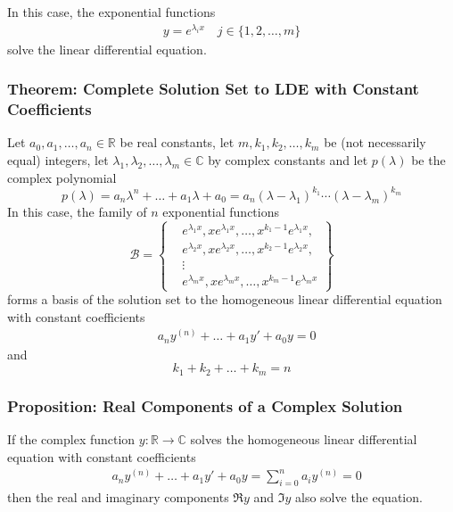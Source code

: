 \documentclass[11pt, a4paper]{article}
\newcommand{\R}{\mathbb{R}} %
\begin{document}
	In this case, the exponential functions
\begin{align*}
	y = e^{\lambda_i x} \quad j \in  \{1, 2, \dots, m\}
\end{align*}
solve the linear differential equation.

\subsubsection{Theorem: Complete Solution Set to LDE with Constant Coefficients}
Let $ a_0, a_1, \dots, a_n \in \R $ be real constants, let $ m, k_1, k_2, \dots, k_m $ be (not necessarily equal) integers, let $ \lambda_1, \lambda_2, \dots, \lambda_m \in \mathbb{C} $ by complex constants and let $ p(\lambda) $ be the complex polynomial
\begin{equation*}
	p(\lambda) = a_n \lambda^n + \dots + a_1 \lambda + a_0 = a_n (\lambda - \lambda_1)^{k_1} \cdots (\lambda - \lambda_m)^{k_m}
\end{equation*}
In this case, the family of $ n $ exponential functions
\[
\mathcal{B}  = 
\begin{Bmatrix}
	&e^{\lambda_1 x}, x e^{\lambda_1 x}, \dots, x^{k_1 -1}e^{\lambda_1 x}, \\[1.5ex]
	&e^{\lambda_2 x}, x e^{\lambda_2 x}, \dots, x^{k_2 -1}e^{\lambda_2 x}, \\[1.5ex]
	&\vdots\\[1.5ex]
	&e^{\lambda_m x}, x e^{\lambda_m x}, \dots, x^{k_m -1 }e^{\lambda_m x} 
\end{Bmatrix}
\]
forms a basis of the solution set to the homogeneous linear differential equation with constant coefficients
\begin{align*}
	& a_n y^{(n)} + \dots + a_1 y' + a_0 y = 0
\end{align*}
and
\begin{equation*}
 	k_1 + k_2 + \dots + k_m = n
\end{equation*}

\subsubsection{Proposition: Real Components of a Complex Solution}
If the complex function $ y : \R \to \mathbb{C} $ solves the homogeneous linear differential equation with constant coefficients
\begin{align*}
	& a_n y^{(n)} + \dots + a_1 y' + a_0 y = \sum_{i = 0}^{n} a_i y^{(n)} = 0
\end{align*}
then the real and imaginary components $ \Re y $ and $ \Im y $ also solve the equation.
\end{document}

